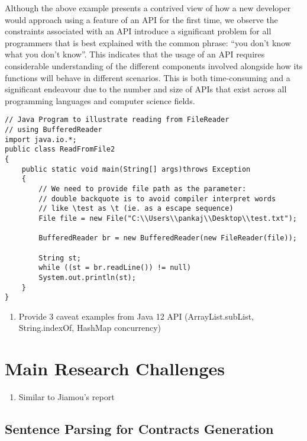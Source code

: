 Although the above example presents a contrived view of how a new developer would approach using a feature of an API for the first time, we observe the constraints associated with an API introduce a significant problem for all programmers that is best explained with the common phrase: ``you don't know what you don't know''. This indicates that the usage of an API requires considerable understanding of the different components involved alongside how its functions will behave in different scenarios. This is both time-consuming and a significant endeavour due to the number and size of APIs that exist across all programming languages and computer science fields.

\begin{lstlisting}[tabsize=4,caption={File reading java code example from GeeksforGeeks},label={lst:code-example}]
// Java Program to illustrate reading from FileReader 
// using BufferedReader 
import java.io.*; 
public class ReadFromFile2 
{ 
	public static void main(String[] args)throws Exception 
	{ 
		// We need to provide file path as the parameter: 
		// double backquote is to avoid compiler interpret words 
		// like \test as \t (ie. as a escape sequence) 
		File file = new File("C:\\Users\\pankaj\\Desktop\\test.txt"); 
		
		BufferedReader br = new BufferedReader(new FileReader(file)); 
		
		String st; 
		while ((st = br.readLine()) != null) 
		System.out.println(st); 
	} 
} 
\end{lstlisting}

\begin{enumerate}
	\item Provide 3 caveat examples from Java 12 API (ArrayList.subList, String.indexOf, HashMap concurrency)
\end{enumerate}

\section{Main Research Challenges}
\label{sec:mainresearchchallenges}

\begin{enumerate}
	\item Similar to Jiamou's report
\end{enumerate}

\subsection{Sentence Parsing for Contracts Generation}

